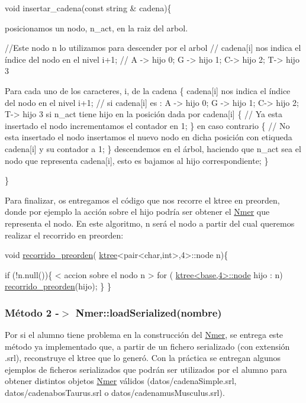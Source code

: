 \begin{DoxyCode}
\textcolor{keywordtype}{void} insertar\_cadena(\textcolor{keyword}{const} \textcolor{keywordtype}{string} & cadena)\{

  posicionamos un nodo, n\_act, en la raiz del arbol.

  \textcolor{comment}{//Este nodo n lo utilizamos para descender por el arbol}
  \textcolor{comment}{// cadena[i] nos indica el índice del nodo en el  nivel i+1;}
  \textcolor{comment}{// A -> hijo 0; G -> hijo 1; C-> hijo 2; T-> hijo 3}

  Para cada uno de los caracteres, i, de la cadena \{
    cadena[i] nos indica el índice del nodo en el  nivel i+1;
    \textcolor{comment}{// si cadena[i] es : A -> hijo 0; G -> hijo 1; C-> hijo 2; T-> hijo 3}
    si n\_act tiene hijo en la posición dada por cadena[i] \{ \textcolor{comment}{// Ya esta insertado el nodo}
      incrementamos el contador en 1;
    \}
    en caso contrario \{ \textcolor{comment}{//  No esta insertado el nodo}
        insertamos el nuevo nodo en dicha posición con etiqueda cadena[i] y su contador a 1;
    \}
    descendemos en el árbol, haciendo que n\_act sea el nodo que representa cadena[i], esto es bajamos al 
      hijo correspondiente;
  \}

\}
\end{DoxyCode}


Para finalizar, os entregamos el código que nos recorre el ktree en preorden, donde por ejemplo la acción sobre el hijo podría ser obtener el \hyperlink{classNmer}{Nmer} que representa el nodo. En este algoritmo, n será el nodo a partir del cual queremos realizar el recorrido en preorden\+:


\begin{DoxyCode}
\textcolor{keywordtype}{void} \hyperlink{ejemploKtree_8cpp_a7ae38f4399966752d1ca1d20d24b63ac}{recorrido\_preorden}( \hyperlink{classktree}{ktree}<pair<char,int>,4>::node  n)\{

\textcolor{keywordflow}{if} (!n.null())\{
   < accion sobre el nodo n >
   \textcolor{keywordflow}{for} ( \hyperlink{classktree_1_1node}{ktree<base,4>::node} hijo : n)
     \hyperlink{ejemploKtree_8cpp_a7ae38f4399966752d1ca1d20d24b63ac}{recorrido\_preorden}(hijo);
  \}
\}
\end{DoxyCode}
\hypertarget{index_load}{}\subsubsection{Método 2 -\/$>$  Nmer\+::load\+Serialized(nombre)}\label{index_load}
Por si el alumno tiene problema en la construcción del \hyperlink{classNmer}{Nmer}, se entrega este método ya implementado que, a partir de un fichero serializado (con extensión .srl), reconstruye el ktree que lo generó. Con la práctica se entregan algunos ejemplos de ficheros serializados que podrán ser utilizados por el alumno para obtener distintos objetos \hyperlink{classNmer}{Nmer} válidos ({\ttfamily datos/cadena\+Simple.\+srl}, {\ttfamily datos/cadenabos\+Taurus.\+srl} o {\ttfamily datos/cadenamus\+Musculus.\+srl}).

